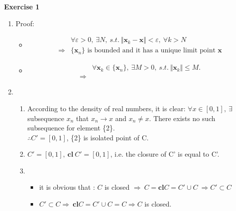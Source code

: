\documentclass[11pt,letter,notitlepage]{article}
\theoremstyle{definition}
\begin{document}
		\begin{solution}
            \textbf{Exercise 1}
            \begin{enumerate}
                \item 
               Proof:
               \begin{itemize}
                    \item 
                    \begin{align*}
                        &\forall \varepsilon >0, ~\exists N, ~s.t. ~\Vert \mathbf{x}_k-\mathbf{x} \Vert <\varepsilon, ~\forall k>N\\
                        \Rightarrow&\{\mathbf{x}_n\} \text{ is bounded and it has a unique limit point }\mathbf{x}
                    \end{align*}
                    
                    \item
                    \begin{align*}
                        &\forall \mathbf{x}_k\in \{\mathbf{x}_n\},~\exists M>0,~s.t.~\Vert \mathbf{x}_k\Vert\leqslant M.\\
                        \Rightarrow&
                    \end{align*}
               \end{itemize}
               
               \item
               \begin{enumerate}
                    \item
                    According to the density of real numbers, it is clear: $\forall x \in [0,1],~\exists $ subsequence ${x_n}$ that $x_n\rightarrow x$ and $x_n\neq x$. There exists no such subsequence for element \{2\}. \\
                    $\therefore C'=[0,1]$, \{2\} is isolated point of C.
                    
                    \item
                    $C'=[0,1],~\mathbf{cl}~C'=[0,1]$, i.e. the closure of C' is equal to C'.
                    
                    \item
                    \begin{itemize}
                        \item
                        it is obvious that : $C$ is closed $\Rightarrow~C=\mathbf{cl}C=C'\cup C~\Rightarrow C'\subset C$
                        \item
                        $C'\subset C\Rightarrow~\mathbf{cl}C=C'\cup C=C\Rightarrow C$ is closed.
                    \end{itemize}

               \end{enumerate}

            \end{enumerate}
		\end{solution}
		\newpage
		
\end{document}
